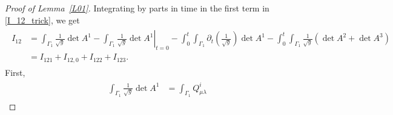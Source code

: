 \documentclass[10pt,reqno]{amsart}
\theoremstyle{plain}
\theoremstyle{definition}
\numberwithin{equation}{section}
\newcommand{\al}{\alpha}
\newcommand{\be}{\beta}
\newcommand{\Ga}{\Gamma}
\newcommand{\la}{\lambda}
\def\referee#1{{\color{green}\hbox{\bf ~#1~}}} %
\begin{document}
\begin{proof}[Proof of Lemma~\ref{L01}]
Integrating by parts in time in the first term in \eqref{I_12_trick},
we get
\begin{align}
\begin{split}
I_{12} & = \int_{\Ga_1} \frac{1}{\sqrt{g}} \det A^1 
- \left.  \int_{\Ga_1} \frac{1}{\sqrt{g}} \det A^1 \right|_{t=0}
- \int_0^t \int_{\Ga_1} \partial_t \left(\frac{1}{\sqrt{g}}\right) \det A^1 
- \int_0^t \int_{\Ga_1} \frac{1}{\sqrt{g}}( \det A^2 + \det A^3)
\\
&
= I_{121} + I_{12,0} + I_{122} + I_{123}.
\end{split}
\label{I_12_break_up}
\end{align}
First, 
\begin{align}
\begin{split}
\int_{\Ga_1} \frac{1}{\sqrt{g}} \det A^1
& = \int_{\Ga_1} Q^i_{\mu \la}

\end{split}
\end{align}
\end{proof}
\end{document}
